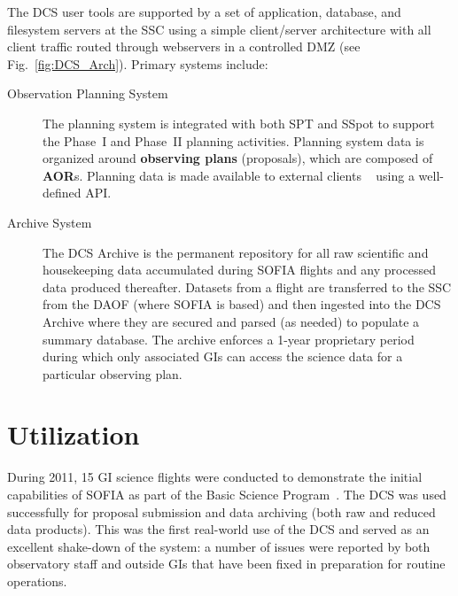 \documentclass[11pt,twoside]{article}
\begin{document}
The DCS user tools are supported by a set of application, database, and filesystem servers at the SSC using a simple client/server architecture with all client traffic routed through webservers in a controlled DMZ (see Fig.~\ref{fig:DCS_Arch}).  Primary systems include:


\begin{description}


\item[Observation Planning System] The planning system is integrated with both SPT and SSpot to support the Phase~I and Phase~II planning activities.  Planning system data is organized around {\bf observing plans} (proposals), which are composed of {\bf AOR}s.  Planning data is made available to external clients ~\citep[e.g. Flight Management Infrastructure,][]{Gross:2009} using a well-defined API.  

\item[Archive System] The DCS Archive is the permanent repository for all raw scientific and housekeeping data accumulated during SOFIA flights and any processed data produced thereafter. Datasets from a flight are transferred to the SSC from the DAOF (where SOFIA is based) and then ingested into the DCS Archive where they are secured and parsed (as needed) to populate a summary database.  The archive enforces a 1-year proprietary period during which only associated GIs can access the science data for a particular observing plan.

\end{description}






\section{Utilization}

During 2011, 15 GI science flights were conducted to demonstrate the initial capabilities of SOFIA as part of the Basic Science Program~\citep{Young:2012}.  The DCS was used successfully for proposal submission and data archiving (both raw and reduced data products).  This was the first real-world use of the DCS and served as an excellent shake-down of the system:  a number of issues were reported by both observatory staff and outside GIs that have been fixed in preparation for routine operations.
\end{document}

